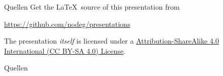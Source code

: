 \documentclass[handout,ngerman]{beamer}
\begin{document}
\begin{frame}{Quellen}
  Get the \LaTeX\ source of this presentation from
  \begin{center}\url{https://github.com/nodeg/presentations}\end{center}
  The presentation \emph{itself} is licensed under a  \href{https://creativecommons.org/licenses/by-sa/4.0/}{Attribution-ShareAlike 4.0 International (CC BY-SA 4.0) License}.
  \begin{center}\doclicenseImage\end{center}
\end{frame}


\begin{frame}[allowframebreaks]{Quellen}
  
  
\end{frame}
\end{document}
